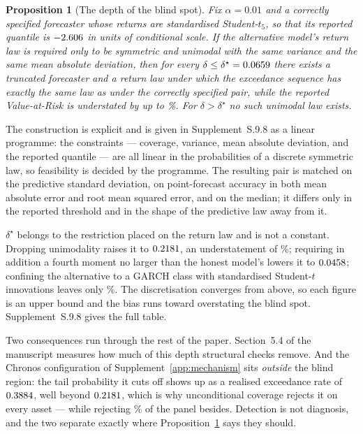 \documentclass[preprint,11pt,authoryear]{elsarticle}
\newtheorem{proposition}[theorem]{Proposition}
\newcommand{\1}{\boldsymbol{1}}
\begin{document}
\begin{proposition}[The depth of the blind spot]
	\label{prop:blindspot_depth}
	Fix $\alpha = 0.01$ and a correctly specified forecaster whose returns are
	standardised Student-$t_5$, so that its reported quantile is
	$-2.606$ in units of conditional scale. If the alternative model's
	return law is required only to be symmetric and unimodal with the same
	variance and the same mean absolute deviation, then for every
	$\delta \le \delta^\star = 0.0659$ there exists a truncated
	forecaster and a return law under which the exceedance sequence has exactly
	the same law as under the correctly specified pair, while the reported
	Value-at-Risk is understated by up to \nGapUndUni\%. For
	$\delta > \delta^\star$ no such unimodal law exists.
\end{proposition}

The construction is explicit and is given in Supplement~S.9.8 as a linear
programme: the constraints --- coverage, variance, mean absolute deviation, and
the reported quantile --- are all linear in the probabilities of a discrete
symmetric law, so feasibility is decided by the programme. The resulting pair
is matched on the predictive standard deviation, on point-forecast accuracy in
both mean absolute error and root mean squared error, and on the median; it
differs only in the reported threshold and in the shape of the predictive law
away from it.

$\delta^\star$ belongs to the restriction placed on the return law and is not a
constant. Dropping unimodality raises it to $0.2181$, an understatement
of \nGapUndFree\%; requiring in addition a fourth moment no larger than the
honest model's lowers it to $0.0458$; confining the alternative to a
GARCH class with standardised Student-$t$ innovations leaves only
\nGapUndGarchT\%. The discretisation
converges from above, so each figure is an upper bound and the bias runs toward
overstating the blind spot. Supplement~S.9.8 gives the full table.

Two consequences run through the rest of the paper. Section~5.4 of the manuscript
measures how much of this depth structural checks remove. And the Chronos
configuration of Supplement~\ref{app:mechanism} sits \emph{outside} the blind
region: the tail probability it cuts off shows up as a realised exceedance rate
of $0.3884$, well beyond $0.2181$, which is why
unconditional coverage rejects it on every asset
--- while rejecting \nSeqKupiecRejRawOne\% of the panel besides. Detection is not
diagnosis, and the two separate exactly where Proposition~\ref{prop:blindspot_depth}
says they should.
\end{document}
